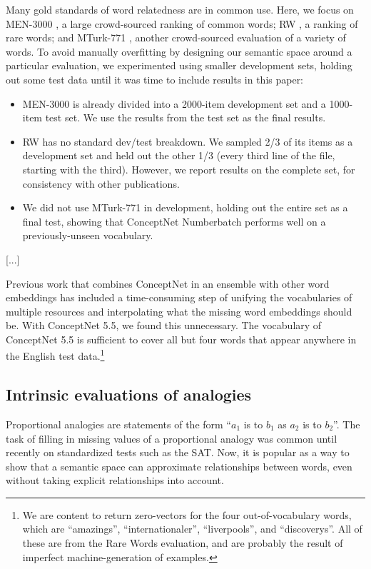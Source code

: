 \documentclass[letterpaper]{article}
\begin{document}
Many gold standards of word relatedness are in common use. Here, we focus on
MEN-3000 \cite{bruni2014men}, a large crowd-sourced ranking of common words; RW
\cite{luong2013rw}, a ranking of rare words; and MTurk-771
\cite{halawi2012mturk}, another crowd-sourced evaluation of a variety of words.
To avoid manually overfitting by designing our semantic space around a
particular evaluation, we experimented using smaller development sets, holding
out some test data until it was time to include results in this paper:

\begin{itemize}
\item
    MEN-3000 is already divided into a 2000-item development set and a
    1000-item test set. We use the results from the test set as the final results.
\item
    RW has no standard dev/test breakdown. We sampled 2/3 of its items as
    a development set and held out the other 1/3 (every third line of the file,
    starting with the third). However, we report results on the complete set,
    for consistency with other publications.
\item
    We did not use MTurk-771 in development, holding out the entire set
    as a final test, showing that ConceptNet Numberbatch performs well on a
    previously-unseen vocabulary.
\end{itemize}


[...]

Previous work that combines ConceptNet in an ensemble with other word
embeddings \cite{speer2016ensemble} has included a time-consuming step of
unifying the vocabularies of multiple resources and interpolating what the
missing word embeddings should be. With ConceptNet 5.5, we found this
unnecessary.  The vocabulary of ConceptNet 5.5 is sufficient to cover all but
four words that appear anywhere in the English test data.\footnote{We are
content to return zero-vectors for the four out-of-vocabulary words, which are
``amazings'', ``internationaler'', ``liverpools'', and ``discoverys''. All of
these are from the Rare Words evaluation, and are probably the result of
imperfect machine-generation of examples.}

\subsection{Intrinsic evaluations of analogies}

Proportional analogies are statements of the form ``$a_1$ is to $b_1$ as $a_2$
is to $b_2$''. The task of filling in missing values of a proportional analogy
was common until recently on standardized tests such as the SAT. Now, it is
popular as a way to show that a semantic space can approximate relationships
between words, even without taking explicit relationships into account.
\end{document}
